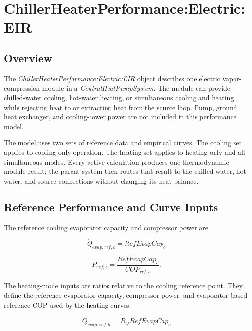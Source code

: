 \section{ChillerHeaterPerformance:Electric:EIR }
\label{chillerheaterperformanceelectriceir}

\subsection{Overview}
\label{overview-008}

The \emph{ChillerHeaterPerformance:Electric:EIR} object describes one electric vapor-compression module in a \emph{CentralHeatPumpSystem}. The module can provide chilled-water cooling, hot-water heating, or simultaneous cooling and heating while rejecting heat to or extracting heat from the source loop. Pump, ground heat exchanger, and cooling-tower power are not included in this performance model.

The model uses two sets of reference data and empirical curves. The cooling set applies to cooling-only operation. The heating set applies to heating-only and all simultaneous modes. Every active calculation produces one thermodynamic module result; the parent system then routes that result to the chilled-water, hot-water, and source connections without changing its heat balance.

\subsection{Reference Performance and Curve Inputs}
\label{reference-performance-and-curve-inputs}

The reference cooling evaporator capacity and compressor power are

\begin{equation}
\dot Q_{evap,ref,c}=RefEvapCap_c
\end{equation}

\begin{equation}
P_{ref,c}=\frac{RefEvapCap_c}{COP_{ref,c}}.
\end{equation}

The heating-mode inputs are ratios relative to the cooling reference point. They define the reference evaporator capacity, compressor power, and evaporator-based reference COP used by the heating curves:

\begin{equation}
\dot Q_{evap,ref,h}=R_Q RefEvapCap_c
\end{equation}

